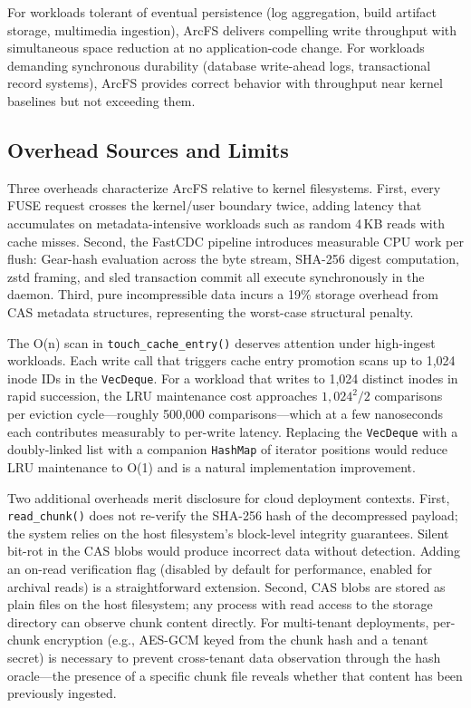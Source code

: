 \documentclass[journal]{IEEEtran}
\begin{document}
For workloads tolerant of eventual persistence (log aggregation, build
artifact storage, multimedia ingestion), ArcFS delivers compelling write
throughput with simultaneous space reduction at no application-code change.
For workloads demanding synchronous durability (database write-ahead logs,
transactional record systems), ArcFS provides correct behavior with
throughput near kernel baselines but not exceeding them.

\subsection{Overhead Sources and Limits}

Three overheads characterize ArcFS relative to kernel filesystems. First,
every FUSE request crosses the kernel/user boundary twice, adding latency
that accumulates on metadata-intensive workloads such as random 4\,KB reads
with cache misses. Second, the FastCDC pipeline introduces measurable CPU
work per flush: Gear-hash evaluation across the byte stream, SHA-256 digest
computation, zstd framing, and sled transaction commit all execute
synchronously in the daemon. Third, pure incompressible data incurs a 19\%
storage overhead from CAS metadata structures, representing the worst-case
structural penalty.

The O(n) scan in \texttt{touch\_cache\_entry()} deserves attention under
high-ingest workloads. Each write call that triggers cache entry promotion
scans up to 1,024 inode IDs in the \texttt{VecDeque}.  For a workload that
writes to 1,024 distinct inodes in rapid succession, the LRU maintenance
cost approaches $1{,}024^2 / 2$ comparisons per eviction cycle---roughly
500,000 comparisons---which at a few nanoseconds each contributes
measurably to per-write latency.  Replacing the \texttt{VecDeque} with a
doubly-linked list with a companion \texttt{HashMap} of iterator positions
would reduce LRU maintenance to O(1) and is a natural implementation
improvement.

Two additional overheads merit disclosure for cloud deployment contexts.
First, \texttt{read\_chunk()} does not re-verify the SHA-256 hash of
the decompressed payload; the system relies on the host filesystem's
block-level integrity guarantees.  Silent bit-rot in the CAS blobs
would produce incorrect data without detection.  Adding an on-read
verification flag (disabled by default for performance, enabled for
archival reads) is a straightforward extension.  Second, CAS blobs are
stored as plain files on the host filesystem; any process with read
access to the storage directory can observe chunk content directly.
For multi-tenant deployments, per-chunk encryption (e.g., AES-GCM keyed
from the chunk hash and a tenant secret) is necessary to prevent
cross-tenant data observation through the hash oracle---the presence
of a specific chunk file reveals whether that content has been
previously ingested.
\end{document}
